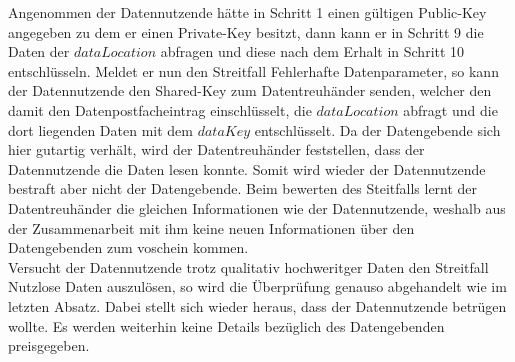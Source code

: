 \documentclass[
	fontsize=12pt,
	headings=small,
	parskip=half,           %
	bibliography=totoc,
	numbers=noenddot,       %
	open=any,               %
]{scrreprt}
\begin{document}
Angenommen der Datennutzende hätte in Schritt 1 einen gültigen Public-Key angegeben zu dem er einen Private-Key besitzt, dann kann er in Schritt 9 die Daten der $dataLocation$ abfragen und diese nach dem Erhalt in Schritt 10 entschlüsseln. Meldet er nun den Streitfall Fehlerhafte Datenparameter, so kann der Datennutzende den Shared-Key zum Datentreuhänder senden, welcher den damit den Datenpostfacheintrag einschlüsselt,  die $dataLocation$ abfragt und die dort liegenden Daten mit dem $dataKey$ entschlüsselt. Da der Datengebende sich hier gutartig verhält, wird der Datentreuhänder feststellen, dass der Datennutzende die Daten lesen konnte. Somit wird wieder der Datennutzende bestraft aber nicht der Datengebende. Beim bewerten des Steitfalls lernt der Datentreuhänder die gleichen Informationen wie der Datennutzende, weshalb aus der Zusammenarbeit mit ihm keine neuen Informationen über den Datengebenden zum voschein kommen. \\

Versucht der Datennutzende trotz qualitativ hochweritger Daten den Streitfall Nutzlose Daten auszulösen, so wird die Überprüfung genauso abgehandelt wie im letzten Absatz. Dabei stellt sich wieder heraus, dass der Datennutzende betrügen wollte. Es werden weiterhin keine Details bezüglich des Datengebenden preisgegeben.\\
\end{document}
